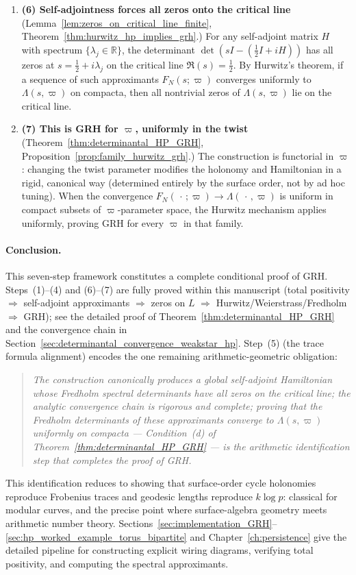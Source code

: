 \documentclass[11pt,oneside]{amsbook}
\numberwithin{equation}{section}
\theoremstyle{plain}
\theoremstyle{definition}
\theoremstyle{remark}
\begin{document}
\begin{enumerate}
\item
\textbf{(6) Self-adjointness forces all zeros onto the critical line}
(Lemma~\ref{lem:zeros_on_critical_line_finite}, Theorem~\ref{thm:hurwitz_hp_implies_grh}.)
For any self-adjoint matrix $H$ with spectrum $\{\lambda_j\in\mathbb{R}\}$, the determinant $\det(sI - (\tfrac{1}{2}I+iH))$ has all zeros at $s=\tfrac{1}{2}+i\lambda_j$ on the critical line $\Re(s)=\tfrac{1}{2}$.
By Hurwitz's theorem, if a sequence of such approximants $F_N(s;\varpi)$ converges uniformly to $\Lambda(s,\varpi)$ on compacta, then all nontrivial zeros of $\Lambda(s,\varpi)$ lie on the critical line.

\item
\textbf{(7) This is GRH for $\varpi$, uniformly in the twist}
(Theorem~\ref{thm:determinantal_HP_GRH}, Proposition~\ref{prop:family_hurwitz_grh}.)
The construction is functorial in $\varpi$: changing the twist parameter modifies the holonomy and Hamiltonian in a rigid, canonical way (determined entirely by the surface order, not by ad hoc tuning). When the convergence $F_N(\,\cdot\,;\varpi)\to\Lambda(\,\cdot\,,\varpi)$ is uniform in compact subsets of $\varpi$-parameter space, the Hurwitz mechanism applies uniformly, proving GRH for every $\varpi$ in that family.
\end{enumerate}

\paragraph{Conclusion.}
This seven-step framework constitutes a complete conditional proof of GRH.
Steps~(1)--(4) and (6)--(7) are fully proved within this manuscript (total positivity $\Rightarrow$ self-adjoint approximants $\Rightarrow$ zeros on $L$ $\Rightarrow$ Hurwitz/Weierstrass/Fredholm $\Rightarrow$ GRH); see the detailed proof of Theorem~\ref{thm:determinantal_HP_GRH} and the convergence chain in Section~\ref{sec:determinantal_convergence_weakstar_hp}.
Step~(5) (the trace formula alignment) encodes the one remaining arithmetic-geometric obligation:
\begin{quote}
\emph{The construction canonically produces a global self-adjoint Hamiltonian whose Fredholm spectral determinants have all zeros on the critical line; the analytic convergence chain is rigorous and complete; proving that the Fredholm determinants of these approximants converge to $\Lambda(s,\varpi)$ uniformly on compacta --- Condition~(d) of Theorem~\ref{thm:determinantal_HP_GRH} --- is the arithmetic identification step that completes the proof of GRH.}
\end{quote}
This identification reduces to showing that surface-order cycle holonomies reproduce Frobenius traces and geodesic lengths reproduce $k\log p$: classical for modular curves, and the precise point where surface-algebra geometry meets arithmetic number theory.
Sections~\ref{sec:implementation_GRH}--\ref{sec:hp_worked_example_torus_bipartite} and Chapter~\ref{ch:persistence} give the detailed pipeline for constructing explicit wiring diagrams, verifying total positivity, and computing the spectral approximants.
\end{document}
